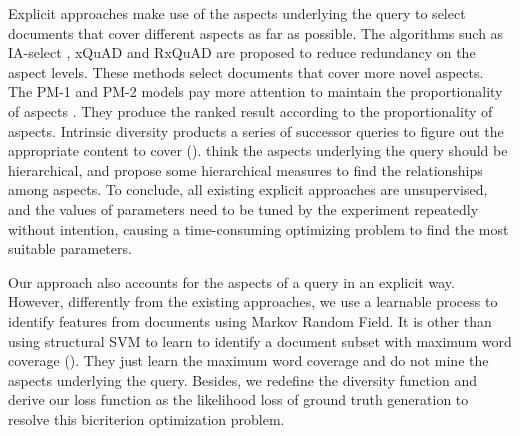 \documentclass[review]{elsarticle}
\begin{document}
{Explicit approaches make use of the aspects underlying the query to select documents that cover different aspects as far as possible. The algorithms such as IA-select \cite{agrawal2009diversifying}, xQuAD \cite{santos2010exploiting} and RxQuAD \cite{vargas2012explicit} are proposed to reduce redundancy on the aspect levels. These methods select documents that cover more novel aspects. The PM-1 and PM-2 models pay more attention to maintain the proportionality of aspects \cite{dang2012diversity}. They produce the ranked result according to the proportionality of aspects. Intrinsic diversity products a series of successor queries to figure out the appropriate content to cover (\cite{raman2013toward}). \cite{Wang:2016:ESR:2911451.2911497,Hu15searchresult} think the aspects underlying the query should be hierarchical, and propose some hierarchical measures to find the relationships among aspects.
To conclude, all existing explicit approaches are unsupervised, and the values of parameters need to be tuned by the experiment repeatedly without intention, causing a time-consuming optimizing problem to find the most suitable parameters.


Our approach also accounts for the aspects of a query in an explicit way. However, differently from the existing approaches, we use a learnable process to identify features from documents using Markov Random Field. It is other than using structural SVM to learn to identify a document subset with maximum word coverage (\cite{zhu2014learning}). They just learn the maximum word coverage and do not mine the aspects underlying the query. Besides, we redefine the diversity function and derive our loss function as the likelihood loss of ground truth generation to resolve this bicriterion optimization problem.}



\end{document}
